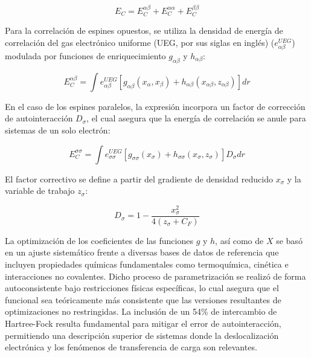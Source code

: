 \begin{equation}
E_{C} = E^{\alpha\beta}_{C} + E^{\alpha\alpha}_{C} + E^{\beta\beta}_{C}
\end{equation}

Para la correlación de espines opuestos, se utiliza la densidad de energía de correlación del gas electrónico uniforme (UEG, por sus siglas en inglés) ($e^{UEG}_{\alpha\beta}$) modulada por funciones de enriquecimiento $g_{\alpha\beta}$ y $h_{\alpha\beta}$:

\begin{equation}
E^{\alpha\beta}_{C} = \int e^{UEG}_{\alpha\beta} \left[ g_{\alpha\beta}(x_{\alpha}, x_{\beta}) + h_{\alpha\beta}(x_{\alpha\beta}, z_{\alpha\beta}) \right] dr
\end{equation}

En el caso de los espines paralelos, la expresión incorpora un factor de corrección de autointeracción $D_{\sigma}$, el cual asegura que la energía de correlación se anule para sistemas de un solo electrón:

\begin{equation}
E^{\sigma \sigma}_{C} = \int e^{UEG}_{\sigma \sigma} [g_{\sigma\sigma}(x_{\sigma}) + h_{\sigma\sigma}(x_{\sigma}, z_{\sigma})] D_{\sigma} dr
\end{equation}

El factor correctivo se define a partir del gradiente de densidad reducido $x_\sigma$ y la variable de trabajo $z_\sigma$:

\begin{equation}
D_{\sigma} = 1 - \frac{x_{\sigma}^2}{4(z_{\sigma} + C_{F})}
\end{equation}

La optimización de los coeficientes de las funciones $g$ y $h$, así como de $X$ se basó en un ajuste sistemático frente a diversas bases de datos de referencia que incluyen propiedades químicas fundamentales como termoquímica, cinética e interacciones no covalentes. Dicho proceso de parametrización se realizó de forma autoconsistente bajo restricciones físicas específicas, lo cual asegura que el funcional sea teóricamente más consistente que las versiones resultantes de optimizaciones no restringidas. La inclusión de un 54\% de intercambio de Hartree-Fock resulta fundamental para mitigar el error de autointeracción, permitiendo una descripción superior de sistemas donde la deslocalización electrónica y los fenómenos de transferencia de carga son relevantes.